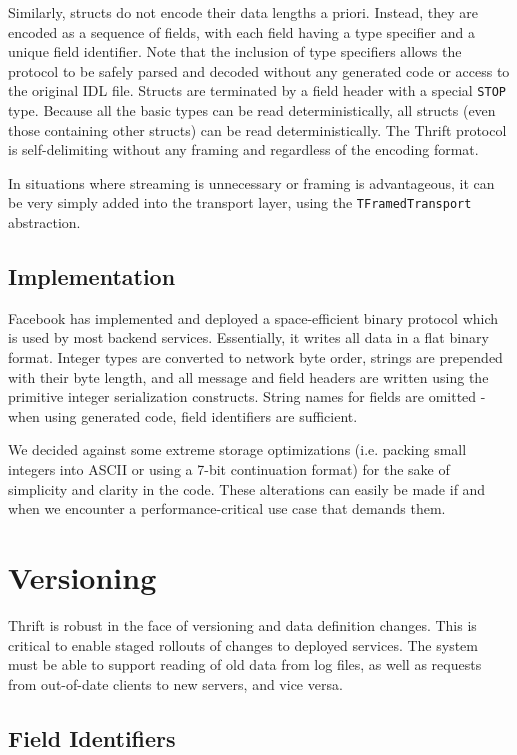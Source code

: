 \documentclass[nocopyrightspace,blockstyle]{sigplanconf}
\begin{document}
Similarly, structs do not encode their data lengths a priori. Instead, they are
encoded as a sequence of fields, with each field having a type specifier and a
unique field identifier. Note that the inclusion of type specifiers allows
the protocol to be safely parsed and decoded without any generated code
or access to the original IDL file. Structs are terminated by a field header
with a special \texttt{STOP} type. Because all the basic types can be read
deterministically, all structs (even those containing other structs) can be
read deterministically. The Thrift protocol is self-delimiting without any
framing and regardless of the encoding format.

In situations where streaming is unnecessary or framing is advantageous, it
can be very simply added into the transport layer, using the
\texttt{TFramedTransport} abstraction.

\subsection{Implementation}

Facebook has implemented and deployed a space-efficient binary protocol which
is used by most backend services. Essentially, it writes all data
in a flat binary format. Integer types are converted to network byte order,
strings are prepended with their byte length, and all message and field headers
are written using the primitive integer serialization constructs. String names
for fields are omitted - when using generated code, field identifiers are
sufficient.

We decided against some extreme storage optimizations (i.e. packing
small integers into ASCII or using a 7-bit continuation format) for the sake
of simplicity and clarity in the code. These alterations can easily be made
if and when we encounter a performance-critical use case that demands them.

\section{Versioning}

Thrift is robust in the face of versioning and data definition changes. This
is critical to enable staged rollouts of changes to deployed services. The
system must be able to support reading of old data from log files, as well as
requests from out-of-date clients to new servers, and vice versa.

\subsection{Field Identifiers}
\end{document}
